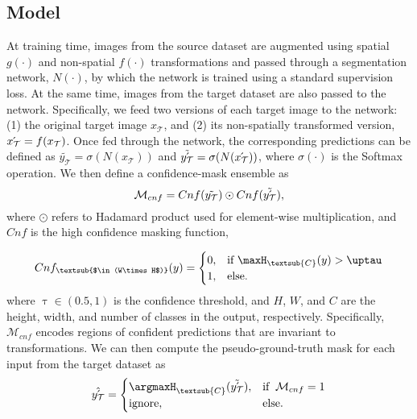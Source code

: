 \subsection{Model} At training time, images from the source dataset are augmented using spatial $g(\cdot)$ and non-spatial $f(\cdot)$ transformations and passed through a segmentation network, $N(\cdot)$, by which the network is trained using a standard supervision loss. At the same time, images from the target dataset are also passed to the network. Specifically, we feed two versions of each target image to the network: (1) the original target image $x_\mathcal{T}$, and (2) its non-spatially transformed version, $\Acute{x_\mathcal{T}} = f(x_\mathcal{T})$. 
Once fed through the network, the corresponding predictions can be defined as $\tilde{y_{\mathcal{T}}} = \sigma(N(x_{\mathcal{T}}))$ and $\tilde{\acute{y_{\mathcal{T}}}} = \sigma(N(\Acute{x_{\mathcal{T}}}))$, where $\sigma(\cdot)$ is the Softmax operation. We then define a confidence-mask ensemble as
\begin{equation}
\mathcal{M}_{cnf} = 
Cnf(\tilde{{y_{\mathcal{T}}}})
\odot
Cnf(\tilde{\Acute{y_{\mathcal{T}}}}),
\label{eq: ensemble of confidence}
\end{equation}
\noindent
where $\odot$ refers to Hadamard product used for element-wise multiplication, and $Cnf$ is the high confidence masking function,
\iffalse
\begin{equation}
    \mathcal{M}_{cnf}(\tilde{\acute{y_T}}, \Acute{\tilde{y_T}}) = h(\tilde{\acute{y_T}})\odot h(\Acute{\tilde{y_T}})
    \label{eq: confidence mask}
\end{equation}
\fi
\begin{equation}
    Cnf_{\textsub{$\in (W\times H$)}}(y) =
    \begin{cases}
    0, & \text{if    } \maxH_{\textsub{C}}(y) > \uptau\\
    1, & \text{else.  }
    \end{cases}
    \label{eq: filtering}
\end{equation}
\noindent
where $\uptau \in (0.5,1) $ is the confidence threshold, and $H$, $W$, and $C$ are the height, width, and number of classes in the output, respectively. Specifically, $\mathcal{M}_{cnf}$ encodes regions of confident predictions that are invariant to transformations.
We can then compute the pseudo-ground-truth mask for each input from the target dataset as
\begin{equation}
\hat{\Acute{y_{\mathcal{T}}}} = 
\begin{cases}
\argmaxH_{\textsub{C}} (\tilde{\Acute{y_{\mathcal{T}}}}), & \text{if  } \:\mathcal{M}_{cnf} = 1\\
\text{ignore}, & \text{else.  }
\end{cases}
\end{equation}
\noindent


